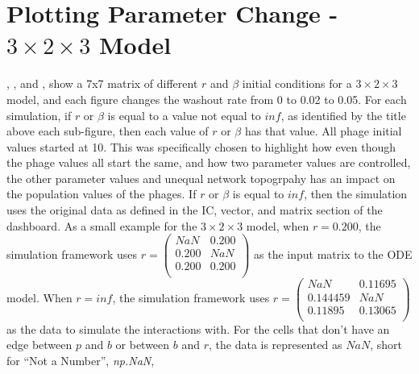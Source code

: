 \section{Plotting Parameter Change - $3\times 2\times 3$ Model}
, , and , show a 7x7 matrix of different $r$ and $\beta$ initial conditions for a $3\times2\times3$ model, and each figure changes the washout rate from 0 to 0.02 to 0.05. 
For each simulation, if $r$ or $\beta$ is equal to a value not equal to $inf$, as identified by the title above each sub-figure, then each value of $r$ or $\beta$ has that value.
All phage initial values started at 10. 
This was specifically chosen to highlight how even though the phage values all start the same, and how two parameter values are controlled, the other parameter values and unequal network topogrpahy has an impact on the population values of the phages. 
If $r$ or $\beta$ is equal to $inf$, then the simulation uses the original data as defined in the IC, vector, and matrix section of the dashboard. 
As a small example for the $3\times 2\times 3$ model, when $r=0.200$, the simulation framework uses $r = \left(\begin{smallmatrix} NaN & 0.200 \\ 0.200 & NaN \\ 0.200 & 0.200 \\ \end{smallmatrix}\right)$ as the input matrix to the ODE model. 
When $r=inf$, the simulation framework uses $r=\left(\begin{smallmatrix} NaN & 0.11695 \\ 0.144459 & NaN \\ 0.11895 & 0.13065 \\ \end{smallmatrix}\right)$ as the data to simulate the interactions with. 
For the cells that don't have an edge between $p$ and $b$ or between $b$ and $r$, the data is represented as $NaN$, short for “Not a Number”, \textit{np.NaN}, 


